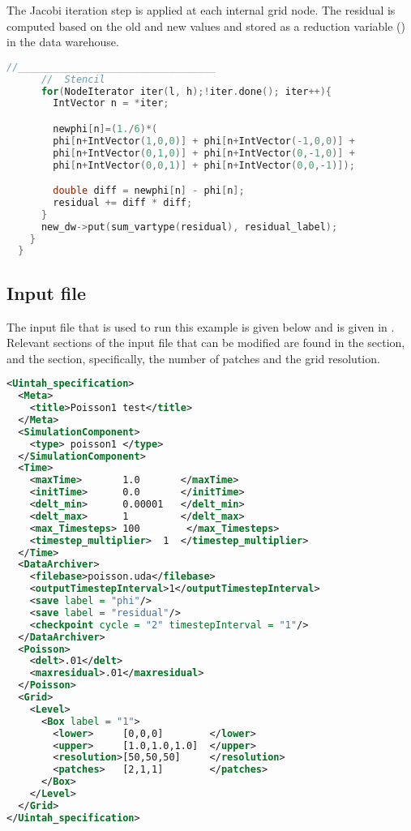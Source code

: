     The Jacobi iteration step is applied at each internal grid node.  The
    residual is computed based on the old and new values and stored as a
    reduction variable () in the data warehouse.

\begin{lstlisting}[language=Cpp]
      //__________________________________
      //  Stencil
      for(NodeIterator iter(l, h);!iter.done(); iter++){
        IntVector n = *iter;

        newphi[n]=(1./6)*(
        phi[n+IntVector(1,0,0)] + phi[n+IntVector(-1,0,0)] +
        phi[n+IntVector(0,1,0)] + phi[n+IntVector(0,-1,0)] +
        phi[n+IntVector(0,0,1)] + phi[n+IntVector(0,0,-1)]);

        double diff = newphi[n] - phi[n];
        residual += diff * diff;
      }
      new_dw->put(sum_vartype(residual), residual_label);
    }
  }
\end{lstlisting}

\subsection{Input file}
The input file that is used to run this example is given below and is
given in
.
Relevant sections of the input file that can be modified are found in
the  section, and the  section,
specifically, the number of patches and the grid resolution.

\begin{lstlisting}[language=XML]
<Uintah_specification>
  <Meta>
    <title>Poisson1 test</title>
  </Meta>
  <SimulationComponent>
    <type> poisson1 </type>
  </SimulationComponent>
  <Time>
    <maxTime>       1.0       </maxTime>
    <initTime>      0.0       </initTime>
    <delt_min>      0.00001   </delt_min>
    <delt_max>      1         </delt_max>
    <max_Timesteps> 100        </max_Timesteps>
    <timestep_multiplier>  1  </timestep_multiplier>
  </Time>
  <DataArchiver>
    <filebase>poisson.uda</filebase>
    <outputTimestepInterval>1</outputTimestepInterval>
    <save label = "phi"/>
    <save label = "residual"/>
    <checkpoint cycle = "2" timestepInterval = "1"/>
  </DataArchiver>
  <Poisson>
    <delt>.01</delt>
    <maxresidual>.01</maxresidual>
  </Poisson>
  <Grid>
    <Level>
      <Box label = "1">
        <lower>     [0,0,0]        </lower>
        <upper>     [1.0,1.0,1.0]  </upper>
        <resolution>[50,50,50]     </resolution>
        <patches>   [2,1,1]        </patches>
      </Box>
    </Level>
  </Grid>
</Uintah_specification>
\end{lstlisting}

